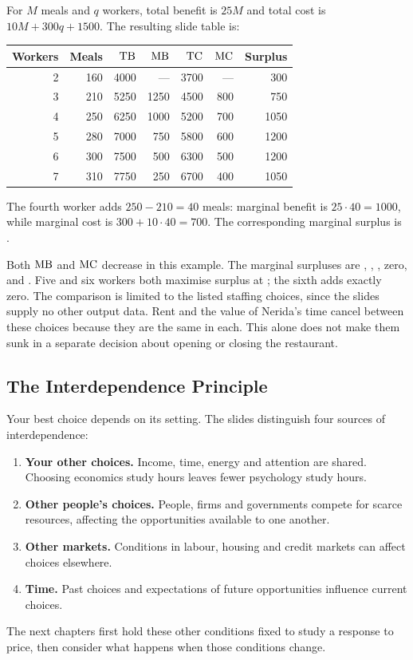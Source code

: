 For $M$ meals and $q$ workers, total benefit is $25M$ and total cost is
$10M+300q+1500$. The resulting slide table is:
\begin{center}\small
\begin{tabular}{rrrrrrr}
\toprule
Workers&Meals&$\operatorname{TB}$&$\operatorname{MB}$&$\operatorname{TC}$&$\operatorname{MC}$&Surplus\\
\midrule
2&160&4000&---&3700&---&300\\
3&210&5250&1250&4500&800&750\\
4&250&6250&1000&5200&700&1050\\
5&280&7000&750&5800&600&1200\\
6&300&7500&500&6300&500&1200\\
7&310&7750&250&6700&400&1050\\
\bottomrule
\end{tabular}
\end{center}
The fourth worker adds $250-210=40$ meals: marginal benefit is
$25\cdot40=1000$, while marginal cost is $300+10\cdot40=700$.
The corresponding marginal surplus is .

Both $\operatorname{MB}$ and $\operatorname{MC}$ decrease in this example. The marginal surpluses
are , , , zero, and . Five and six workers both maximise surplus
at ; the sixth adds exactly zero. The comparison is limited
to the listed staffing choices, since the slides supply no other output data.
Rent and the value of Nerida's time cancel between these choices because
they are the same in each. This alone does not make them sunk in a separate
decision about opening or closing the restaurant.

\subsection{The Interdependence Principle}
Your best choice depends on its setting. The slides distinguish four
sources of interdependence:
\begin{enumerate}
\item \textbf{Your other choices.} Income, time, energy and attention are
shared. Choosing economics study hours leaves fewer psychology study hours.
\item \textbf{Other people's choices.} People, firms and governments compete
for scarce resources, affecting the opportunities available to one another.
\item \textbf{Other markets.} Conditions in labour, housing and credit markets
can affect choices elsewhere.
\item \textbf{Time.} Past choices and expectations of future opportunities
influence current choices.
\end{enumerate}
The next chapters first hold these other conditions fixed to study a
response to price, then consider what happens when those conditions change.

